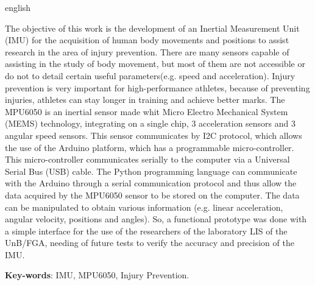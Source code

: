\begin{resumo}[Abstract]
 \begin{otherlanguage*}{english}
 	
 	The objective of this work is the development of an Inertial Measurement Unit (IMU) for the acquisition of human body movements and positions to assist research in the area of injury prevention. There are many sensors capable of assisting in the study of body movement, but most of them are not accessible or do not to detail certain useful parameters(e.g. speed and acceleration). Injury prevention is very important for high-performance athletes, because of preventing injuries, athletes can stay longer in training and achieve better marks. The MPU6050 is an inertial sensor made whit Micro Electro Mechanical System (MEMS) technology, integrating on a single chip, 3 acceleration sensors and 3 angular speed sensors. This sensor communicates by I2C protocol, which allows the use of the Arduino platform, which has a programmable micro-controller. This micro-controller communicates serially to the computer via a Universal  Serial Bus (USB) cable. The Python programming language can communicate with the Arduino through a serial communication protocol and thus allow the data acquired by the MPU6050 sensor to be stored on the computer. The data can be manipulated to obtain various information (e.g. linear acceleration, angular velocity, positions and angles). So, a functional prototype was done with a simple interface for the use of the researchers of the laboratory LIS of the UnB/FGA, needing of future tests to verify the accuracy and precision of the IMU.

   \vspace{\onelineskip}
 
   \noindent 
   \textbf{Key-words}: IMU, MPU6050, Injury Prevention.
 \end{otherlanguage*}
\end{resumo}
